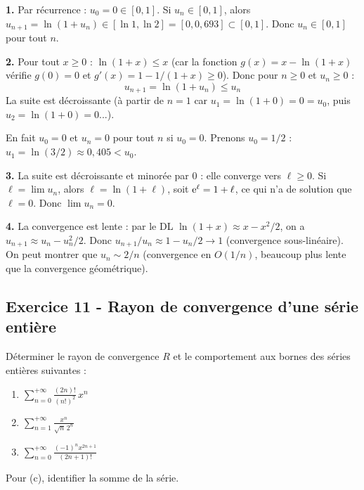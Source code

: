 \documentclass[12pt,a4paper]{article}
\begin{document}
\begin{boitecorrige}
\textbf{1.} Par récurrence : $u_0 = 0 \in [0,1]$. Si $u_n \in [0,1]$, alors $u_{n+1} = \ln(1+u_n) \in [\ln 1, \ln 2] = [0, 0{,}693] \subset [0,1]$. Donc $u_n \in [0,1]$ pour tout $n$.

\textbf{2.} Pour tout $x \geq 0$ : $\ln(1+x) \leq x$ (car la fonction $g(x) = x - \ln(1+x)$ vérifie $g(0)=0$ et $g'(x)=1-1/(1+x)\geq0$). Donc pour $n\geq0$ et $u_n \geq 0$ :
\[
u_{n+1} = \ln(1+u_n) \leq u_n
\]
La suite est décroissante (à partir de $n=1$ car $u_1 = \ln(1+0) = 0 = u_0$, puis $u_2 = \ln(1+0) = 0$...).

En fait $u_0 = 0$ et $u_n = 0$ pour tout $n$ si $u_0 = 0$. Prenons $u_0 = 1/2$ : $u_1 = \ln(3/2) \approx 0{,}405 < u_0$.

\textbf{3.} La suite est décroissante et minorée par 0 : elle converge vers $\ell \geq 0$. Si $\ell = \lim u_n$, alors $\ell = \ln(1+\ell)$, soit $\mathrm{e}^\ell = 1+\ell$, ce qui n'a de solution que $\ell = 0$. Donc $\lim u_n = 0$.

\textbf{4.} La convergence est lente : par le DL $\ln(1+x) \approx x - x^2/2$, on a $u_{n+1} \approx u_n - u_n^2/2$. Donc $u_{n+1}/u_n \approx 1 - u_n/2 \to 1$ (convergence sous-linéaire). On peut montrer que $u_n \sim 2/n$ (convergence en $O(1/n)$, beaucoup plus lente que la convergence géométrique).
\end{boitecorrige}

\subsection*{Exercice 11 - Rayon de convergence d'une série entière \niveau{\moyen}}

\begin{boiteexercice}
Déterminer le rayon de convergence $R$ et le comportement aux bornes des séries entières suivantes :
\begin{enumerate}[label=(\alph*)]
  \item $\displaystyle\sum_{n=0}^{+\infty}\frac{(2n)!}{(n!)^2}\,x^n$
  \item $\displaystyle\sum_{n=1}^{+\infty}\frac{x^n}{\sqrt{n}\,2^n}$
  \item $\displaystyle\sum_{n=0}^{+\infty}\frac{(-1)^n x^{2n+1}}{(2n+1)!}$
\end{enumerate}
Pour (c), identifier la somme de la série.
\end{boiteexercice}
\end{document}
